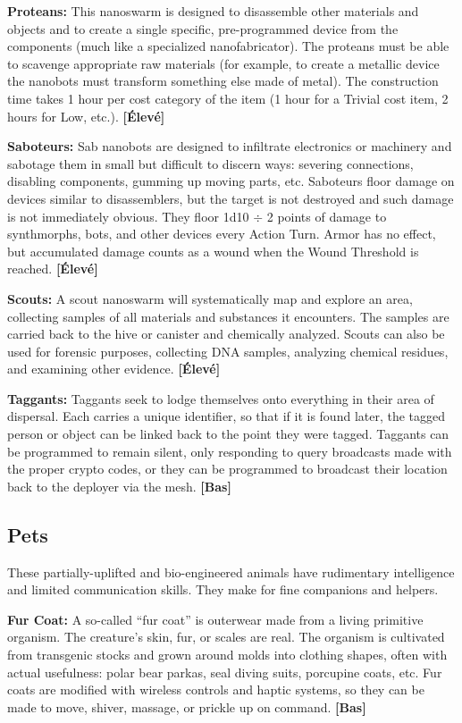 {{\textbf{Proteans:} This nanoswarm is designed to disassemble other materials and objects and to create a single specific, pre-programmed device from the components (much like a specialized nanofabricator). The proteans must be able to scavenge appropriate raw materials (for example, to create a metallic device the nanobots must transform something else made of metal). The construction time takes 1 hour per cost category of the item (1 hour for a Trivial cost item, 2 hours for Low, etc.). \textbf{[Élevé]} 

\textbf{Saboteurs:} Sab nanobots are designed to infiltrate electronics or machinery and sabotage them in small but difficult to discern ways: severing connections, disabling components, gumming up moving parts, etc. Saboteurs floor damage on devices similar to disassemblers, but the target is not destroyed and such damage is not immediately obvious. They floor 1d10 $\div$ 2 points of damage to synthmorphs, bots, and other devices every Action Turn. Armor has no effect, but accumulated damage counts as a wound when the Wound Threshold is reached. \textbf{[Élevé]} 

\textbf{Scouts:} A scout nanoswarm will systematically map and explore an area, collecting samples of all materials and substances it encounters. The samples are carried back to the hive or canister and chemically analyzed. Scouts can also be used for forensic purposes, collecting DNA samples, analyzing chemical residues, and examining other evidence. \textbf{[Élevé]} 

\textbf{Taggants:} Taggants seek to lodge themselves onto everything in their area of dispersal. Each carries a unique identifier, so that if it is found later, the tagged person or object can be linked back to the point they were tagged. Taggants can be programmed to remain silent, only responding to query broadcasts made with the proper crypto codes, or they can be programmed to broadcast their location back to the deployer via the mesh. \textbf{[Bas]} 



\subsection{Pets} \label{sec:pets} 

These partially-uplifted and bio-engineered animals have rudimentary intelligence and limited communication skills. They make for fine companions and helpers. 

\textbf{Fur Coat:} A so-called ``fur coat'' is outerwear made from a living primitive organism. The creature’s skin, fur, or scales are real. The organism is cultivated from transgenic stocks and grown around molds into clothing shapes, often with actual usefulness: polar bear parkas, seal diving suits, porcupine coats, etc. Fur coats are modified with wireless controls and haptic systems, so they can be made to move, shiver, massage, or prickle up on command. \textbf{[Bas]} 

}}
